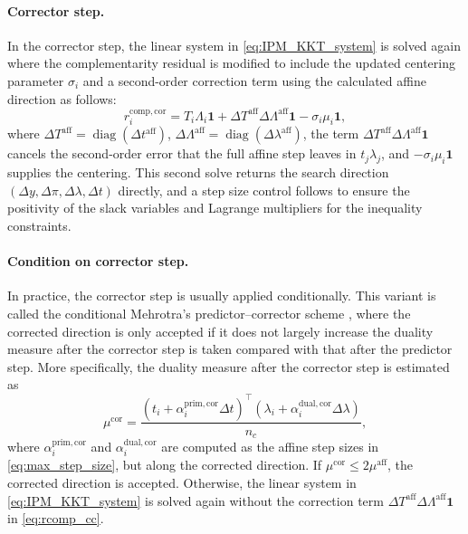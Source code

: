\documentclass[class=scrbook, crop=false]{standalone}
\begin{document}
\paragraph{Corrector step.}
In the corrector step, the linear system in \eqref{eq:IPM_KKT_system} is solved again
where the complementarity residual is modified to 
include the updated centering parameter $\sigma_i$ 
and a second-order correction term using the calculated affine direction as follows:
\begin{equation}
    r_i^{\mathrm{comp},\mathrm{cor}}
    = T_i\Lambda_i\mathbf{1} + \Delta T^{\mathrm{aff}}\Delta\Lambda^{\mathrm{aff}}\mathbf{1} - \sigma_i\mu_i\mathbf{1},
    \label{eq:rcomp_cc}
\end{equation}
where $\Delta T^{\mathrm{aff}} = \operatorname{diag}({\Delta t^{\mathrm{aff}}})$, $\Delta \Lambda^{\mathrm{aff}} = \operatorname{diag}({\Delta \lambda}^{\mathrm{aff}})$,
the term $\Delta T^{\mathrm{aff}}\Delta\Lambda^{\mathrm{aff}}\mathbf{1}$ cancels
the second-order error that the full affine step leaves in $t_j\lambda_j$,
and $-\sigma_i\mu_i\mathbf{1}$ supplies the centering.
This second solve returns the search direction $(\Delta y,\Delta\pi,\Delta\lambda,\Delta t)$ directly,
and a step size control follows to ensure the positivity of the slack variables and Lagrange multipliers for the inequality constraints.

\paragraph{Condition on corrector step.}
In practice, the corrector step is usually applied conditionally.
This variant is called the conditional Mehrotra's predictor--corrector scheme \cite{nocedalAdaptiveBarrierUpdate2009a},
where the corrected direction is only accepted
if it does not largely increase the duality measure after the corrector step is taken compared with that after the predictor step.
More specifically, the duality measure after the corrector step is estimated as
\begin{equation}
    \mu^{\mathrm{cor}} = \frac{(t_i + \alpha_i^{\mathrm{prim}, \mathrm{cor}} \Delta t)^\top (\lambda_i + \alpha_i^{\mathrm{dual}, \mathrm{cor}} \Delta \lambda)}{n_c},
\end{equation}
where $\alpha_i^{\mathrm{prim}, \mathrm{cor}}$ and $\alpha_i^{\mathrm{dual}, \mathrm{cor}}$ are computed 
as the affine step sizes in \eqref{eq:max_step_size},
but along the corrected direction.
If $\mu^{\mathrm{cor}} \leq 2\mu^{\mathrm{aff}}$, the corrected direction is accepted.
Otherwise, the linear system in \eqref{eq:IPM_KKT_system} is solved again 
without the correction term $\Delta T^{\mathrm{aff}}\Delta\Lambda^{\mathrm{aff}}\mathbf{1}$ in \eqref{eq:rcomp_cc}.
\end{document}
